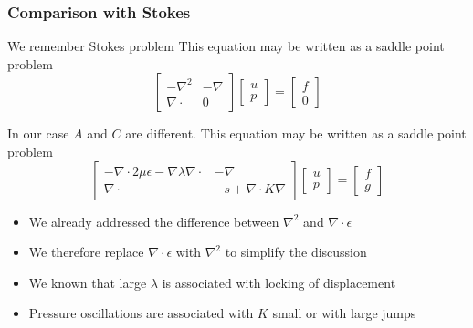 \begin{frame}
\frametitle{Comparison with Stokes}
We remember Stokes problem 
This equation may be written as a saddle point problem 
\[
\left[
\begin{array}{cc}
-\nabla^2 & -\nabla \\
\nabla\cdot & 0  
\end{array}
\right]
\left[
\begin{array}{c} u \\ p \end{array} 
\right]
= 
\left[
\begin{array}{c} f \\ 0 \end{array} 
\right]
\]

In our case $A$ and $C$ are different. 
This equation may be written as a saddle point problem 
\[
\left[
\begin{array}{cc}
-\nabla\cdot 2 \mu \epsilon - \nabla \lambda \nabla \cdot & -\nabla  \\
\nabla\cdot  & -s+\nabla\cdot K \nabla  
\end{array}
\right]
\left[
\begin{array}{c} u \\ p \end{array} 
\right]
= 
\left[
\begin{array}{c} f \\ g \end{array} 
\right]
\]

\begin{itemize}
\item We already addressed the difference between $\nabla^2$ and $\nabla\cdot \epsilon$   
\item We therefore replace $\nabla\cdot \epsilon$ with $\nabla^2$ to simplify the discussion  
\item We known that large $\lambda$ is associated with  locking of displacement  
\item Pressure oscillations are associated with  $K$ small or with large jumps  
\end{itemize}



\end{frame}
